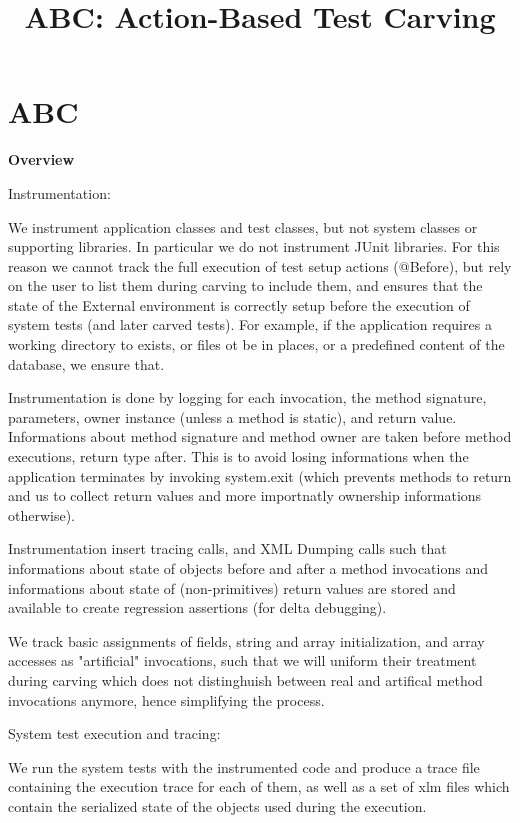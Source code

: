 \documentclass[10pt,conference]{IEEEtran}
\title{ABC: Action-Based Test Carving}
\author{\IEEEauthorblockN{Alessio Gambi}
\IEEEauthorblockA{\textit{University of Passau} \\
Passau, Germany \\
alessio.gambi@uni-passau.de}%
}
\begin{document}
\maketitle

\begin{abstract}
\end{abstract}

\section{ABC}
\textbf{Overview}

Instrumentation:

We instrument application classes and test classes, but not system classes or supporting libraries. In particular we do not instrument JUnit libraries.
For this reason we cannot track the full execution of test setup actions (@Before), but rely on the user to list them during carving to include them, and
ensures that the state of the External environment is correctly setup before the execution of system tests (and later carved tests).
For example, if the application requires a working directory to exists, or files ot be in places, or a predefined content of the database, we ensure that.

Instrumentation is done by logging for each invocation, the method signature, parameters, owner instance (unless a method is static), and return value.
Informations about method signature and method owner are taken before method executions, return type after. This is to avoid losing informations when the application terminates by invoking system.exit (which prevents methods to return and us to collect return values and more importnatly ownership informations otherwise).

Instrumentation insert tracing calls, and XML Dumping calls such that informations about state of objects before and after a method invocations and informations about state of (non-primitives) return values are stored and available to create regression assertions (for delta debugging).

We track basic assignments of fields, string and array initialization, and array accesses as "artificial" invocations, such that we will uniform their treatment during carving which does not distinghuish between real and artifical method invocations anymore, hence simplifying the process.

System test execution and tracing:

We run the system tests with the instrumented code and produce a trace file containing the execution trace for each of them, as well as a set of xlm files which contain the serialized state of the objects used during the execution.
\end{document}
